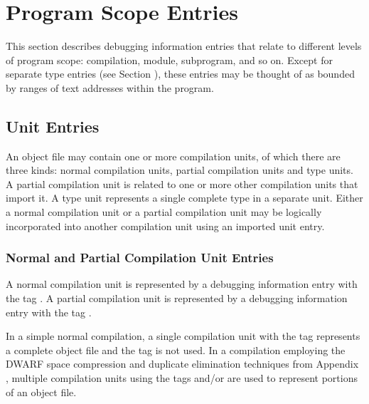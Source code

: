 \chapter{Program Scope Entries}
\label{chap:programscopeentries} 
This section describes debugging information entries that
relate to different levels of program scope: compilation,
module, subprogram, and so on. Except for separate type
entries (see Section ), 
these entries may be thought of
as bounded by ranges of text addresses within the program.

\section{Unit Entries}
An object file may contain one or more compilation units,
of which there are three kinds: normal compilation units,
partial compilation units and type units. A partial compilation
unit is related to one or more other compilation units that
import it. A type unit represents a single complete type in a
separate unit. Either a normal compilation unit or a partial
compilation unit may be logically incorporated into another
compilation unit using an imported unit entry.

\subsection[Normal and Partial CU Entries]{Normal and Partial Compilation Unit Entries}
\label{chap:normalandpartialcompilationunitentries}

A normal compilation unit is represented by a debugging
information entry with the 
tag . A partial
compilation unit is represented by a debugging information
entry with the 
tag .

In a simple normal compilation, a single compilation unit with
the tag 
 represents a complete object file
and the tag 
 is not used. 
In a compilation
employing the DWARF space compression and duplicate elimination
techniques from 
Appendix , 
multiple compilation units using
the tags 
 and/or 
 are
used to represent portions of an object file.

